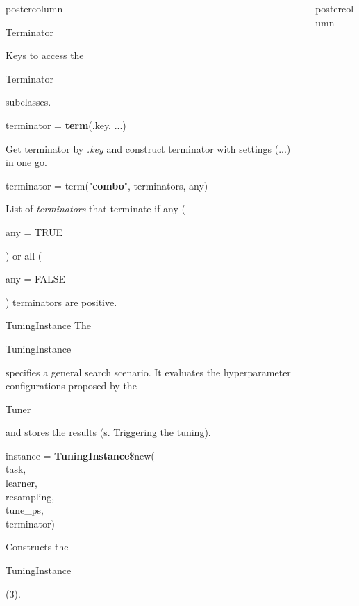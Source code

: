 \documentclass{beamer}
\newcommand{\codeinline}[1]{\begin{codeboxinline}#1\end{codeboxinline}}
\begin{document}
\begin{frame}[fragile]{}
\begin{columns}
\begin{column}{.245\textwidth}
\begin{beamercolorbox}[center]{postercolumn}
\begin{minipage}{.98\textwidth}
{\begin{myblock}{Terminator}
\begin{itemize}
							\end{itemize}
							\vspace{0.5cm}
							Keys to access the \codeinline{Terminator} subclasses.
							\\
							\begin{codebox}
								terminator = \textbf{term}(.key, ...)
							\end{codebox}
							Get terminator by \textit{.key} and construct terminator with settings (...) in one go.
							\\
							\begin{codebox}
								terminator = term("\textbf{combo}", terminators, any)
							\end{codebox}
							List of \textit{terminators} that terminate if any (\codeinline{any = TRUE}) or all (\codeinline{any = FALSE}) terminators are positive.
						\end{myblock}
						\begin{myblock}{TuningInstance}
							The \codeinline{TuningInstance} specifies a general search scenario. It evaluates the hyperparameter configurations proposed by the \codeinline{Tuner} and stores the results (s. Triggering the tuning).
							\\
							\begin{codeboxmultiline}[width=18cm]
								instance = \textbf{TuningInstance}\$new(\\
								\hspace*{1ex}task,\\
								\hspace*{1ex}learner,\\
								\hspace*{1ex}resampling,\\
								\hspace*{1ex}tune\_ps,\\
								\hspace*{1ex}terminator)
							\end{codeboxmultiline}
							Constructs the \codeinline{TuningInstance} (3).
							\\
						\end{myblock}
						\vfill}
				\end{minipage}
			\end{beamercolorbox}
		\end{column}
		\begin{column}{.245\textwidth}
			\begin{beamercolorbox}[center]{postercolumn}
				\begin{minipage}{.98\textwidth}

\end{minipage}
\end{beamercolorbox}
\end{column}
\end{columns}
\end{frame}
\end{document}
